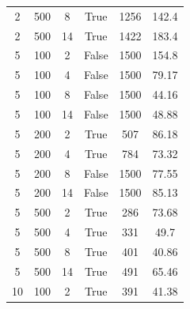 \begin{table}[H]
\begin{minipage}{0.48\textwidth}
\begin{tabular}{cccccc}
		2             & 500                             & 8                              & True             & 1256          & 142.4             \\
		2             & 500                             & 14                             & True             & 1422          & 183.4             \\
		\midrule
		5             & 100                             & 2                              & False            & 1500          & 154.8             \\
		5             & 100                             & 4                              & False            & 1500          & 79.17             \\
		5             & 100                             & 8                              & False            & 1500          & 44.16             \\
		5             & 100                             & 14                             & False            & 1500          & 48.88             \\
		5             & 200                             & 2                              & True             & 507           & 86.18             \\
		5             & 200                             & 4                              & True             & 784           & 73.32             \\
		5             & 200                             & 8                              & False            & 1500          & 77.55             \\
		5             & 200                             & 14                             & False            & 1500          & 85.13             \\
		5             & 500                             & 2                              & True             & 286           & 73.68             \\
		5             & 500                             & 4                              & True             & 331           & 49.7              \\
		5             & 500                             & 8                              & True             & 401           & 40.86             \\
		5             & 500                             & 14                             & True             & 491           & 65.46             \\
		\midrule
		10            & 100                             & 2                              & True             & 391           & 41.38             \\

\end{tabular}
\end{minipage}
\end{table}
